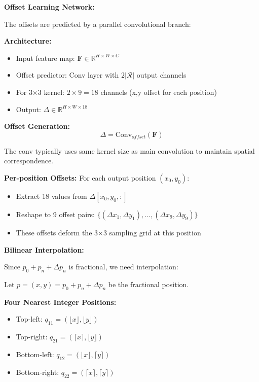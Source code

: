 \documentclass[12pt]{article}
\newcommand{\explanation}[1]{{\color{explanationcolor}#1}}
\begin{document}
\begin{enumerate}[(a)]
{    \textbf{Offset Learning Network:}
    
    \explanation{
    The offsets are predicted by a parallel convolutional branch:
    
    \textbf{Architecture:}
    \begin{itemize}
        \item Input feature map: $\mathbf{F} \in \mathbb{R}^{H \times W \times C}$
        \item Offset predictor: Conv layer with $2|\mathcal{R}|$ output channels
        \item For 3×3 kernel: $2 \times 9 = 18$ channels (x,y offset for each position)
        \item Output: $\Delta \in \mathbb{R}^{H \times W \times 18}$
    \end{itemize}
    
    \textbf{Offset Generation:}
    \[\Delta = \text{Conv}_{offset}(\mathbf{F})\]
    
    The conv typically uses same kernel size as main convolution to maintain spatial correspondence.
    
    \textbf{Per-position Offsets:}
    For each output position $(x_0, y_0)$:
    \begin{itemize}
        \item Extract 18 values from $\Delta[x_0, y_0, :]$
        \item Reshape to 9 offset pairs: $\{(\Delta x_1, \Delta y_1), ..., (\Delta x_9, \Delta y_9)\}$
        \item These offsets deform the 3×3 sampling grid at this position
    \end{itemize}
    }
    
    \textbf{Bilinear Interpolation:}
    
    \explanation{
    Since $p_0 + p_n + \Delta p_n$ is fractional, we need interpolation:
    
    Let $p = (x, y) = p_0 + p_n + \Delta p_n$ be the fractional position.
    
    \textbf{Four Nearest Integer Positions:}
    \begin{itemize}
        \item Top-left: $q_{11} = (\lfloor x \rfloor, \lfloor y \rfloor)$
        \item Top-right: $q_{21} = (\lceil x \rceil, \lfloor y \rfloor)$
        \item Bottom-left: $q_{12} = (\lfloor x \rfloor, \lceil y \rceil)$
        \item Bottom-right: $q_{22} = (\lceil x \rceil, \lceil y \rceil)$
    \end{itemize}
    
}}
\end{enumerate}
\end{document}
